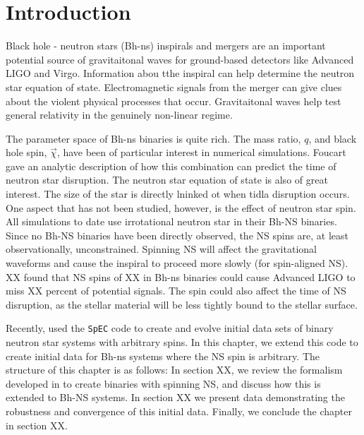 

\section{Introduction}


Black hole - neutron stars (Bh-ns) inspirals and mergers are an important potential source of gravitaitonal waves for ground-based detectors like Advanced LIGO and Virgo. Information abou tthe inspiral can help determine the neutron star equation of state. Electromagnetic signals from the merger can give clues about the violent physical processes that occur. Gravitaitonal waves help test general relativity in the genuinely non-linear regime.

The parameter space of Bh-ns binaries is quite rich. The mass ratio, $q$, and black hole spin, $\vec{\chi}$, have been of particular interest in numerical simulations. Foucart  gave an analytic description of how this combination can predict the time of neutron star disruption. The neutron star equation of state is also of great interest. The size of the star is directly lninked ot when tidla disruption occurs. One aspect that has not been studied, however, is the effect of neutron star spin. All simulations to date use irrotational neutron star in their Bh-NS binaries. Since no Bh-NS binaries have been directly observed, the NS spins are, at least observationally, unconstrained. Spinning NS will affect the gravitational waveforms and cause the inspiral to proceed more slowly (for spin-aligned NS).  XX found that NS spins of XX in Bh-ns binaries could cause Advanced LIGO to miss XX percent of potential signals. The spin could also affect the time of NS disruption, as the stellar material will be less tightly bound to the stellar surface.

Recently, \cite{Tacik:2015tja} used the {\tt SpEC} code to create and
evolve initial data sets of binary neutron star systems with arbitrary
spins. In this chapter, we extend this code to create initial data for
Bh-ns systems where the NS spin is arbitrary. The structure of this
chapter is as follows: In section XX, we review the formalism
developed in \cite{Tichy:2011gw} to create binaries with spinning NS,
and discuss how this is extended to Bh-NS systems. In section XX we
present data demonstrating the robustness and convergence of this
initial data. Finally, we conclude the chapter in section XX.

